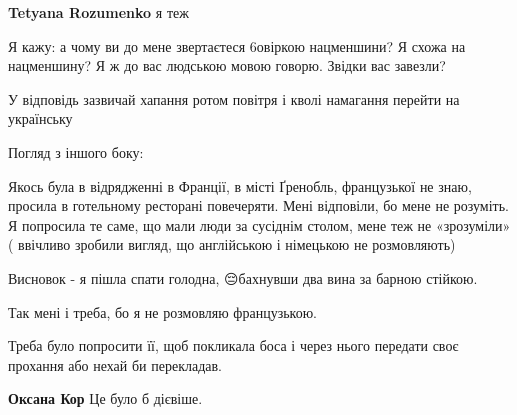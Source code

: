 \begin{itemize}
\begin{itemize}
\textbf{Tetyana Rozumenko} я теж
\end{itemize}

 

Я кажу: а чому ви до мене звертаєтеся 6овіркою нацменшини? Я схожа на
нацменшину? Я ж до вас людською мовою говорю. Звідки вас завезли?

У відповідь зазвичай хапання ротом повітря і кволі намагання перейти на
українську


 

Погляд з іншого боку:

Якось була в відрядженні в Франції, в місті Ґренобль, французької не знаю,
просила в готельному ресторані повечеряти. Мені відповіли, бо мене не розуміть.
Я попросила те саме, що мали люди за сусіднім столом, мене теж не «зрозуміли» (
ввічливо зробили вигляд, що англійською і німецькою не розмовляють)

Висновок - я пішла спати голодна, 😔бахнувши два вина за барною стійкою.

Так мені і треба, бо я не розмовляю французькою. 🥺

 
Треба було попросити її, щоб покликала боса і через нього передати своє
прохання або нехай би перекладав.

\begin{itemize}
 
\textbf{Оксана Кор} Це було б дієвіше.
\end{itemize}

 

\end{itemize}
